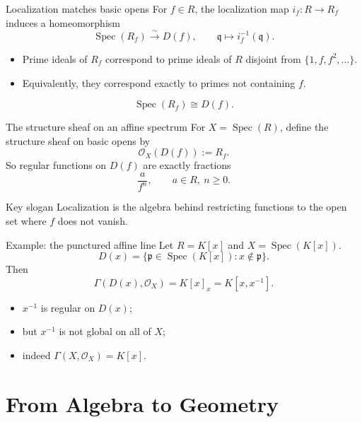 \documentclass[10pt, aspectratio=169]{beamer}
\DeclareMathOperator{\Spec}{Spec}
\newcommand{\OO}{\mathcal{O}}
\begin{document}
\begin{frame}{Localization matches basic opens}
    For $f \in R$, the localization map $i_f : R \to R_f$ induces a homeomorphism
    \[
    \Spec(R_f) \xrightarrow{\sim} D(f),
    \qquad \mathfrak q \longmapsto i_f^{-1}(\mathfrak q).
    \]
    \begin{itemize}
        \item Prime ideals of $R_f$ correspond to prime ideals of $R$ disjoint from $\{1,f,f^2,\dots\}$.
        \item Equivalently, they correspond exactly to primes not containing $f$.
    \end{itemize}
    \[
    \boxed{\Spec(R_f) \cong D(f).}
    \]
\end{frame}

\begin{frame}{The structure sheaf on an affine spectrum}
    For $X = \Spec(R)$, define the structure sheaf on basic opens by
    \[
    \OO_X(D(f)) := R_f.
    \]
    So regular functions on $D(f)$ are exactly fractions
    \[
    \frac{a}{f^n}, \qquad a \in R,\ n \ge 0.
    \]
    \begin{block}{Key slogan}
        Localization is the algebra behind restricting functions to the open set where $f$ does not vanish.
    \end{block}
\end{frame}

\begin{frame}{Example: the punctured affine line}
    Let $R = K[x]$ and $X = \Spec(K[x])$.
    \[
    D(x) = \{\mathfrak p \in \Spec(K[x]) : x \notin \mathfrak p\}.
    \]
    Then
    \[
    \Gamma(D(x), \OO_X) = K[x]_x = K[x, x^{-1}].
    \]
    \begin{itemize}
        \item $x^{-1}$ is regular on $D(x)$;
        \item but $x^{-1}$ is not global on all of $X$;
        \item indeed $\Gamma(X, \OO_X) = K[x]$.
    \end{itemize}
\end{frame}

\section{From Algebra to Geometry}
\end{document}

